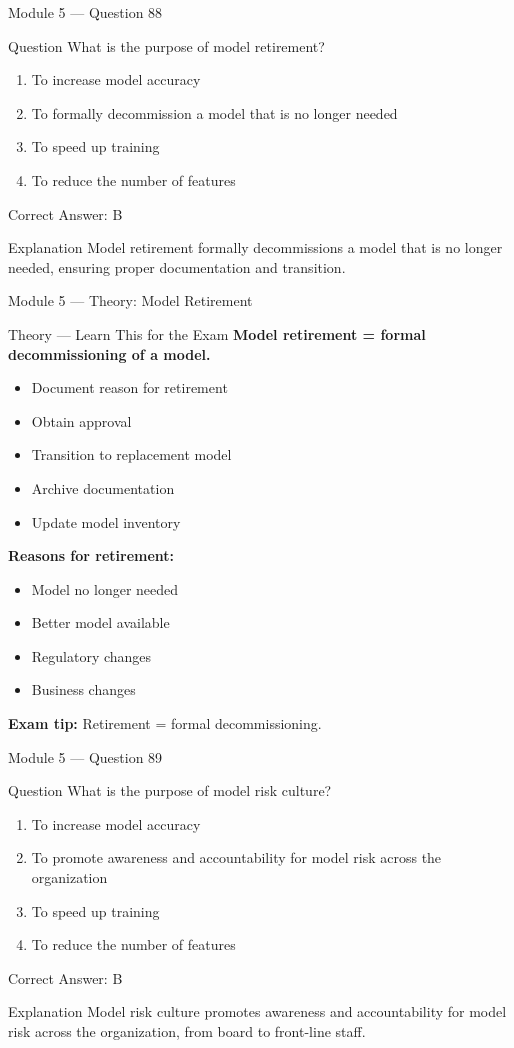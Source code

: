 \documentclass[aspectratio=169,10pt]{beamer}
\newcommand{\question}[1]{%
	\begin{block}{Question}
		#1
	\end{block}
}
\newcommand{\options}[4]{%
	\begin{enumerate}[label=\Alph*.,leftmargin=*]
		\item #1
		\item #2
		\item #3
		\item #4
	\end{enumerate}
}
\newcommand{\answerbox}[1]{%
	\begin{exampleblock}{Correct Answer: #1}
	\end{exampleblock}
}
\newcommand{\explain}[1]{%
	\begin{block}{Explanation}
		\small #1
	\end{block}
}
\newcommand{\theory}[1]{%
	\begin{block}{Theory --- Learn This for the Exam}
		\small #1
	\end{block}
}
\begin{document}
	\begin{frame}{Module 5 --- Question 88}
		\question{What is the purpose of model retirement?}
		\options{To increase model accuracy}{To formally decommission a model that is no longer needed}{To speed up training}{To reduce the number of features}
		\answerbox{B}
		\explain{Model retirement formally decommissions a model that is no longer needed, ensuring proper documentation and transition.}
	\end{frame}
	
	\begin{frame}{Module 5 --- Theory: Model Retirement}
		\theory{
			\textbf{Model retirement = formal decommissioning of a model.}
			\begin{itemize}
				\item Document reason for retirement
				\item Obtain approval
				\item Transition to replacement model
				\item Archive documentation
				\item Update model inventory
			\end{itemize}
			\textbf{Reasons for retirement:}
			\begin{itemize}
				\item Model no longer needed
				\item Better model available
				\item Regulatory changes
				\item Business changes
			\end{itemize}
			\textbf{Exam tip:} Retirement = formal decommissioning.
		}
	\end{frame}
	
	\begin{frame}{Module 5 --- Question 89}
		\question{What is the purpose of model risk culture?}
		\options{To increase model accuracy}{To promote awareness and accountability for model risk across the organization}{To speed up training}{To reduce the number of features}
		\answerbox{B}
		\explain{Model risk culture promotes awareness and accountability for model risk across the organization, from board to front-line staff.}
	\end{frame}
	
\end{document}
